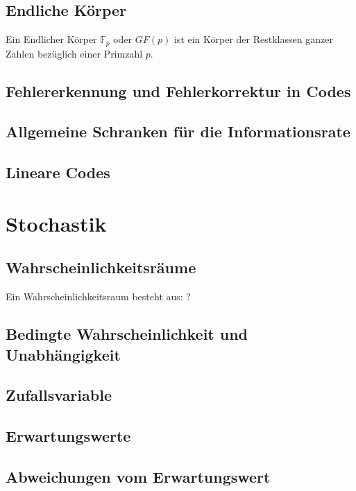 \subsection{Endliche Körper}

Ein Endlicher Körper $\mathbb{F}_p$ oder $GF(p)$ ist ein Körper der Restklassen ganzer Zahlen bezüglich einer Primzahl $p$.

\subsection{Fehlererkennung und Fehlerkorrektur in Codes}
\subsection{Allgemeine Schranken für die Informationsrate}
\subsection{Lineare Codes}
%
%
%
\section{Stochastik}
\subsection{Wahrscheinlichkeitsräume}

Ein Wahrscheinlichkeitsraum besteht aus: ?

\subsection{Bedingte Wahrscheinlichkeit und Unabhängigkeit}
\subsection{Zufallsvariable}
\subsection{Erwartungswerte}
\subsection{Abweichungen vom Erwartungswert}

